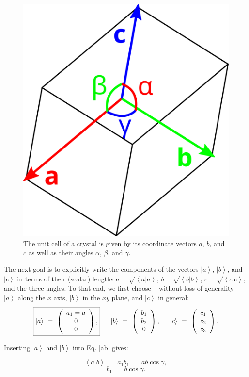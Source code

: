 \begin{figure}
	\centering
	\includegraphics[width = 0.2 \textwidth]{figures/cell}
	\caption[Crystal unit cell.]{
		The unit cell of a crystal is given by its coordinate vectors $a$, $b$, and $c$ 
		as well as their angles $\alpha$, $\beta$, and $\gamma$.}
	\label{fig:cell}
\end{figure}



The next goal is to explicitly write the components of the vectors $\left| a \right>$, $\left| b \right>$, and $\left| c \right>$ in terms of their (scalar) lengths $a = \sqrt{\left< a | a \right>}$, $b = \sqrt{\left< b | b \right>}$, $c = \sqrt{\left< c | c \right>}$, and the three angles.
To that end, we first choose -- without loss of generality -- $\left| a \right>$ along the $x$ axis, $\left| b \right>$ in the $xy$ plane, and $\left| c \right>$ in general:
\begin{equation} 
	\boxed{ \left| a \right> \ =\  \left( \begin{array}{c} a_1 = a \\ 0 \\ 0 \end{array} \right), }
	\hspace{0.5cm} \left| b \right> \ =\  \left( \begin{array}{c} b_1 \\ b_2 \\ 0 \end{array} \right),
	\hspace{0.5cm} \left| c \right> \ =\  \left( \begin{array}{c} c_1 \\ c_2 \\ c_3 \end{array} \right).
\end{equation}


Inserting $\left| a \right>$ and $\left| b \right>$ into Eq. \ref{ab} gives:

\begin{equation} \left< a | b \right > \ =\  a_1 b_1 \ =\  ab \cos \gamma, \end{equation}
\begin{equation} b_1 \ =\  b \cos \gamma. \end{equation}


